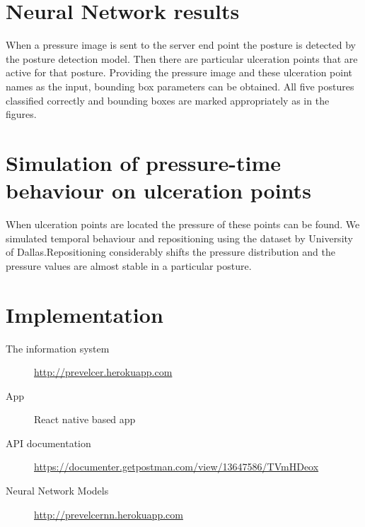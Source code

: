 \section{Neural Network results}
When a pressure image is sent to the server end point the posture is detected by the posture detection model. Then there are particular ulceration points that are active for that posture. Providing the pressure image and these ulceration point names as the input, bounding box parameters can be obtained.
All five postures classified correctly and bounding boxes are marked appropriately as in the figures.

\section{Simulation of pressure-time behaviour on ulceration points}

When ulceration points are located the pressure of these points can be found. We simulated temporal behaviour and repositioning using the dataset by University of Dallas.Repositioning considerably shifts the pressure distribution and the pressure values are almost stable in a particular posture.



\section{Implementation}

\begin{description}
    \item[The information system]   \url{http://prevelcer.herokuapp.com}
    \item[App] React native based app
    \item[API documentation] \url{https://documenter.getpostman.com/view/13647586/TVmHDeox}
    \item[Neural Network Models] \url{http://prevelcernn.herokuapp.com}
\end{description}




